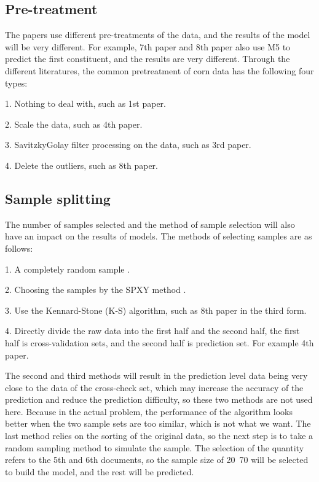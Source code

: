 \documentclass[a4paper,12pt,titlepage]{article} %
\numberwithin{equation}{section}  %
\begin{document}
	\subsection{Pre-treatment}
	\label{sec:treat}
	The papers use different pre-treatments of the data, and the results of the model will be very different. For example, 7th paper and 8th paper also use M5 to predict the first constituent, and the results are very different. Through the different literatures, the common pretreatment of corn data has the following four types:
	
	1. Nothing to deal with, such as 1st paper.
	
	2. Scale the data, such as 4th paper.
	
	3. SavitzkyGolay filter processing on the data, such as 3rd paper.
	
	4. Delete the outliers, such as 8th paper.
	
	\subsection{Sample splitting}
	\label{splitting}
	The number of samples selected and the method of sample selection will also have an impact on the results of models. The methods of selecting samples are as follows:
	
	1. A completely random sample \citep{1su2006partial}.
	
	2. Choosing the samples by the SPXY method \citep{3galvao2007cross}.
	
	3. Use the Kennard-Stone (K-S) algorithm, such as 8th paper  in the third form.
	
	4. Directly divide the raw data into the first half and the second half, the first half is cross-validation sets, and the second half is prediction set. For example 4th paper.
	
	The second and third methods will result in the prediction level data being very close to the data of the cross-check set, which may increase the accuracy of the prediction and reduce the prediction difficulty, so these two methods are not used here. Because in the actual problem, the performance of the algorithm looks better when the two sample sets are too similar, which is not what we want. The last method relies on the sorting of the original data, so the next step is to take a random sampling method to simulate the sample. The selection of the quantity refers to the 5th and 6th documents, so the sample size of 20~70 will be selected to build the model, and the rest will be predicted.
	
\end{document}
